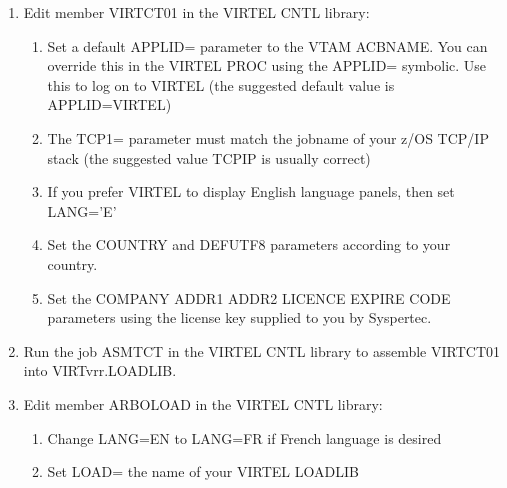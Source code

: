 \documentclass[letterpaper,10pt,english]{sphinxmanual}
\begin{document}
\begin{sphinxVerbatim}[commandchars=\\\{\}]
 
\end{sphinxVerbatim}
\begin{enumerate}
%
\setcounter{enumi}{6}
\item {} 
\sphinxAtStartPar
Edit member VIRTCT01 in the VIRTEL CNTL library:\sphinxhyphen{}
\begin{enumerate}
%
\item {} 
\sphinxAtStartPar
Set a default APPLID= parameter to the VTAM ACBNAME. You can override this in the VIRTEL PROC using the APPLID= symbolic. Use this to log on to VIRTEL (the suggested default value is APPLID=VIRTEL)

\item {} 
\sphinxAtStartPar
The TCP1= parameter must match the jobname of your z/OS TCP/IP stack (the suggested value TCPIP is usually correct)

\item {} 
\sphinxAtStartPar
If you prefer VIRTEL to display English language panels, then set LANG=’E’

\item {} 
\sphinxAtStartPar
Set the COUNTRY and DEFUTF8 parameters according to your country.

\item {} 
\sphinxAtStartPar
Set the COMPANY ADDR1 ADDR2 LICENCE EXPIRE CODE parameters using the license key supplied to you by Syspertec.

\end{enumerate}

\item {} 
\sphinxAtStartPar
Run the job ASMTCT in the VIRTEL CNTL library to assemble VIRTCT01 into VIRTvrr.LOADLIB.

\item {} 
\sphinxAtStartPar
Edit member ARBOLOAD in the VIRTEL CNTL library:
\begin{enumerate}
%
\item {} 
\sphinxAtStartPar
Change LANG=EN to LANG=FR if French language is desired

\item {} 
\sphinxAtStartPar
Set LOAD= the name of your VIRTEL LOADLIB


\end{enumerate}
\end{enumerate}
\end{document}

